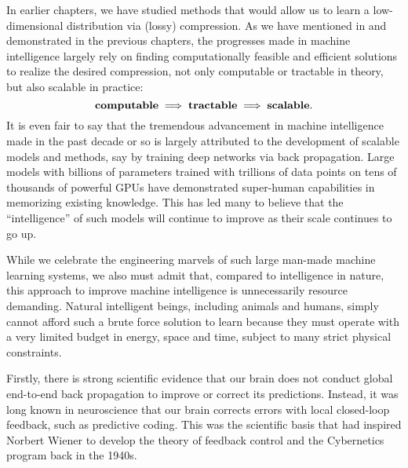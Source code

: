 \documentclass[../../book-main.tex]{subfiles}
\begin{document}
In earlier chapters, we have studied methods that would allow us to learn a low-dimensional distribution via (lossy) compression. As we have mentioned in  and demonstrated in the previous chapters, the progresses made in machine intelligence largely rely on finding computationally feasible and efficient solutions to realize the desired compression, not only computable or tractable in theory, but also scalable in practice:
\begin{equation}
\mbox{\textbf{computable}} \;
   \Longrightarrow \; \mbox{\textbf{tractable}} \; \Longrightarrow \; 
   \mbox{\textbf{scalable}}.
\end{equation}
It is even fair to say that the tremendous advancement in machine intelligence made in the past decade or so is largely attributed to the development of scalable models and methods, say by training deep networks via back propagation. Large models with billions of parameters trained with trillions of data points on tens of thousands of powerful GPUs have demonstrated super-human capabilities in memorizing existing knowledge. This has led many to believe that the ``intelligence'' of such models will continue to improve as their scale continues to go up. 

While we celebrate the engineering marvels of such large man-made machine learning  systems, we also must admit that, compared to intelligence in nature, this approach to improve machine intelligence is unnecessarily resource demanding. Natural intelligent beings, including animals and humans, simply cannot afford such a brute force solution to learn because they must operate with a very limited budget in energy, space and time, subject to many strict physical constraints. 

Firstly, there is strong scientific evidence that our brain does not conduct global end-to-end back propagation to improve or correct its predictions. Instead, it was long known in neuroscience that our brain corrects errors with local closed-loop feedback, such as predictive coding. This was the scientific basis that had inspired Norbert Wiener to develop the theory of feedback control and the Cybernetics program back in the 1940s. 
\end{document}
